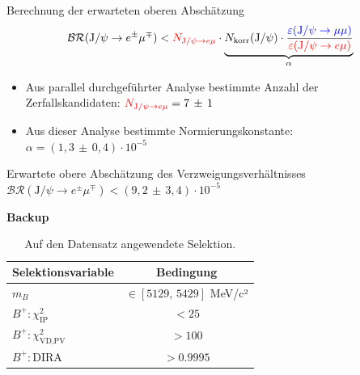 \begin{frame}[t]{Berechnung der erwarteten oberen Abschätzung}
  \begin{equation*}
    \mathcal{BR}(\text{J}/\psi\rightarrow e^{\pm}\mu^{\mp})<\textcolor{red}{N_{\text{J}/\psi\rightarrow e\mu}}\cdot\underbrace{ N_\text{korr}(\text{J}/\psi)\cdot\frac{\textcolor{blue}{\varepsilon(\text{J}/\psi\rightarrow\mu\mu)}}{\textcolor{red}{\varepsilon(\text{J}/\psi\rightarrow e\mu)}}}_{\alpha}
  \end{equation*}
  \begin{itemize}
    \item Aus parallel durchgeführter Analyse bestimmte Anzahl der Zerfallskandidaten: $\textcolor{red}{N_{\text{J}/\psi\rightarrow e\mu}}=7\,\pm\,1$
    \item Aus dieser Analyse bestimmte Normierungskonstante: $\alpha=(1,3\,\pm\,0,4)\cdot10^{-5}$
  \end{itemize}
  \begin{block}{Erwartete obere Abschätzung des Verzweigungsverhältnisses}
    \centering
    $\mathcal{BR}(\text{J}/\psi\rightarrow e^{\pm}\mu^{\mp})<(9,2\,\pm\,3,4)\cdot10^{-5}$
  \end{block}
\end{frame}

\appendix

\begin{frame}
  \centering
  \Huge{\textbf{Backup}}
\end{frame}

\begin{frame}
  \begin{table}[htb]
    \centering
    \caption{Auf den Datensatz angewendete Selektion.}
    \begin{tabular}{lc}
      \toprule
      Selektionsvariable                & Bedingung      \\
      \midrule
      $m_{B}$                           & $\in[\num{5129},\,\num{5429}]$ MeV/c²  \\
      $B^{+}:\chi_{\text{IP}}^2$        & $<\num{25}$  \\
      $B^{+}:\chi_{\text{VD,PV}}^2$     & $>\num{100}$  \\
      $B^{+}:\text{DIRA}$               & $>\num{0.9995}$  \\
      \bottomrule
    \end{tabular}
    \label{tab:bstrip}
  \end{table}
\end{frame}

